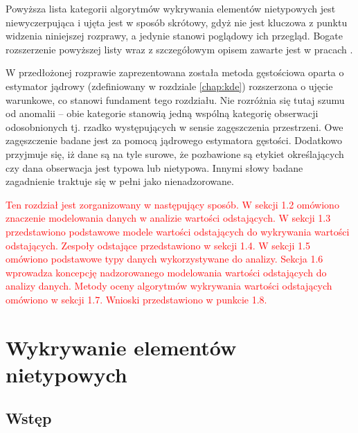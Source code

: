 \documentclass[12pt,a4paper,oneside]{book}
\theoremstyle{definition}
\begin{document}
Powyższa lista kategorii algorytmów wykrywania elementów nietypowych jest niewyczerpująca i ujęta jest w sposób skrótowy, gdyż nie jest kluczowa z punktu widzenia niniejszej rozprawy, a jedynie stanowi poglądowy ich przegląd. Bogate rozszerzenie powyższej listy wraz z szczegółowym opisem zawarte jest w pracach \cite{Aggarwal_2017, Hawkins_1980, Hodge_2004, Rousseeuw_2011}.

W przedłożonej rozprawie zaprezentowana została metoda gęstościowa oparta o estymator jądrowy (zdefiniowany w rozdziale \ref{chap:kde}) rozszerzona o ujęcie warunkowe, co stanowi fundament tego rozdziału. Nie rozróżnia się tutaj szumu od anomalii -- obie kategorie stanowią jedną wspólną kategorię obserwacji odosobnionych tj. rzadko występujących w sensie zagęszczenia przestrzeni. Owe zagęszczenie badane jest za pomocą jądrowego estymatora gęstości. Dodatkowo przyjmuje się, iż dane są na tyle surowe, że pozbawione są etykiet określających czy dana obserwacja jest typowa lub nietypowa. Innymi słowy badane zagadnienie traktuje się w pełni jako nienadzorowane.

\textcolor{red}{Ten rozdział jest zorganizowany w następujący sposób. W sekcji 1.2 omówiono znaczenie modelowania danych w analizie wartości odstających. W sekcji 1.3 przedstawiono podstawowe modele wartości odstających do wykrywania wartości odstających. Zespoły odstające przedstawiono w sekcji 1.4. W sekcji 1.5 omówiono podstawowe typy danych wykorzystywane do analizy. Sekcja 1.6 wprowadza koncepcję nadzorowanego modelowania wartości odstających do analizy danych. Metody oceny algorytmów wykrywania wartości odstających omówiono w sekcji 1.7. Wnioski przedstawiono w punkcie 1.8.}

\chapter{Wykrywanie elementów nietypowych} \label{chap:outliers_detection}

\section{Wstęp}
\end{document}
